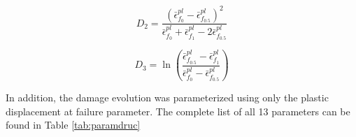 \begin{equation}
D_2=\frac{\left (\bar{\epsilon}^{pl}_{f_0}- \bar{\epsilon}^{pl}_{f_{0.5}} \right )^2}{\bar{\epsilon}^{pl}_{f_0}+ \bar{\epsilon}^{pl}_{f_1}-2\bar{\epsilon}^{pl}_{f_{0.5}}}
\label{eqn:dparam8}
\end{equation}

\begin{equation}
D_3=\ln \left (\frac{\bar{\epsilon}^{pl}_{f_{0.5}}-\bar{\epsilon}^{pl}_{f_1}}{\bar{\epsilon}^{pl}_{f_0} -\bar{\epsilon}^{pl}_{f_{0.5}}}\right )
\label{eqn:dparam9}
\end{equation}

In addition, the damage evolution was parameterized using only the plastic displacement at failure parameter. The complete list of all 13 parameters can be found in Table \ref{tab:paramdruc}

